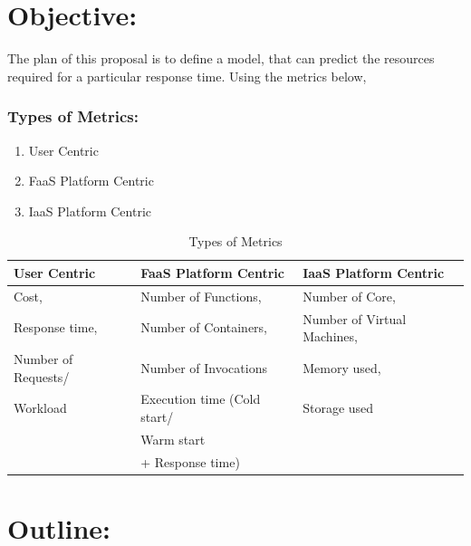 \section{Objective:}

The plan of this proposal is to define a model, that can predict the resources required for a particular response time. 
Using the metrics below,

\subsubsection{Types of Metrics:}

\begin{enumerate}
    \item User Centric
    \item FaaS Platform Centric
    \item IaaS Platform Centric
\end{enumerate}

\begin{table}[htpb]
    \caption[Metrics table]{Types of Metrics}\label{tab:sample}
    \centering
    \begin{tabular}{l l l}
      \toprule
        User Centric & FaaS Platform Centric & IaaS Platform Centric \\
      \midrule
        Cost, & Number of Functions, & Number of Core,\\
        Response time, & Number of Containers, & Number of Virtual Machines,\\
        Number of Requests/ & Number of Invocations & Memory used,\\
        Workload & Execution time (Cold start/ & Storage used \\
        & Warm start & \\
        & + Response time) & \\ 
      \bottomrule
    \end{tabular}
  \end{table}

\section{Outline:}

